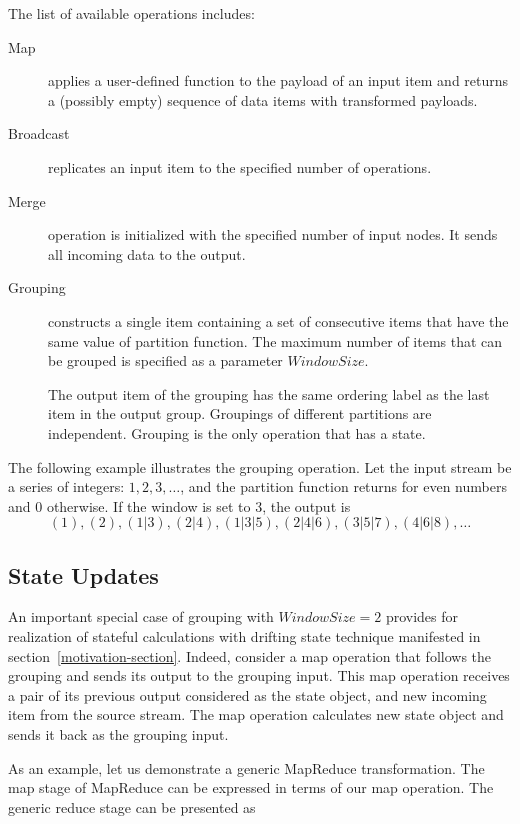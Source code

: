 The list of available operations includes:
\begin {description}
  \item [Map] applies a user-defined function to the payload of an input item and returns a (possibly empty) sequence of data items with transformed payloads. 

  \item [Broadcast] replicates an input item to the specified number of operations.

  \item [Merge] operation is initialized with the specified number of input nodes. It sends all incoming data to the output.

  \item [Grouping] constructs a single item containing a set of consecutive items that have the same value of partition function. The maximum number of items that can be grouped is specified as a parameter  $Window Size$. 
    
  The output item of the grouping has the same ordering label as the last item in the output group. Groupings of different partitions are independent. Grouping is the only operation that has a state.
\end {description}

The following example illustrates  the grouping operation. Let the input stream be a series of integers: $ 1,2,3, \ldots$, and the  partition function returns for even numbers and 0 otherwise. If the window is set to 3, the output is 
$$(1), (2), (1|3), (2|4), (1|3|5), (2|4|6), (3|5|7), (4|6|8), \ldots$$


\subsection{State Updates}
\label{fs-drifting}

An important special case of grouping with $Window Size = 2$  provides for realization of stateful calculations with drifting state technique manifested in section~\ref{motivation-section}. Indeed, consider a map operation that follows the grouping and sends its output to the grouping input. This map operation receives a pair of its previous output considered as the state object, and new incoming item from the source stream. The map operation calculates new state object and sends it back as the grouping input. 

As an example, let us demonstrate a generic MapReduce transformation. The map stage of MapReduce can be expressed in terms of our map operation. The generic reduce stage can be presented as


